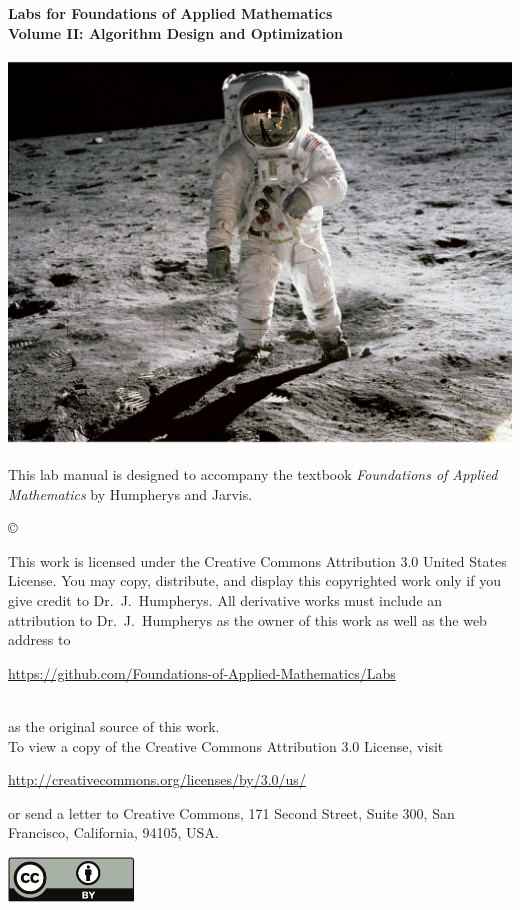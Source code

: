 \documentclass[nociteref]{SIAM-GH-book}
\begin{document}

\thispagestyle{empty} %

\begin{center}
{\huge \bf Labs for Foundations of Applied Mathematics} \\
\vspace{5mm}
{\Large \bf Volume II: Algorithm Design and Optimization}
\vspace{20mm}

\includegraphics[scale=.5]{Cover.pdf}
\end{center}
\frontmatter



\begin{thepreface} %

This lab manual is designed to accompany the textbook \emph{Foundations of Applied Mathematics} by Humpherys and Jarvis.

\vfill
\copyright{This work is licensed under the Creative Commons Attribution 3.0 United States
License.  You may copy, distribute, and display this copyrighted work only if you give
credit to Dr.~J.~Humpherys. All derivative works must include an attribution to Dr.~J.~Humpherys as the owner of this work as well as the web address to
\\\centerline{\url{https://github.com/Foundations-of-Applied-Mathematics/Labs}}\\as the original source of this work.
\\To view a copy of the Creative Commons Attribution 3.0 License, visit
\\\centerline{\url{http://creativecommons.org/licenses/by/3.0/us/}} or send a letter to Creative Commons, 171 Second Street, Suite 300, San Francisco, California, 94105, USA.}

\vfill
\centering\includegraphics[height=1.2cm]{by.pdf}
\vfill
\end{thepreface}
\end{document}
